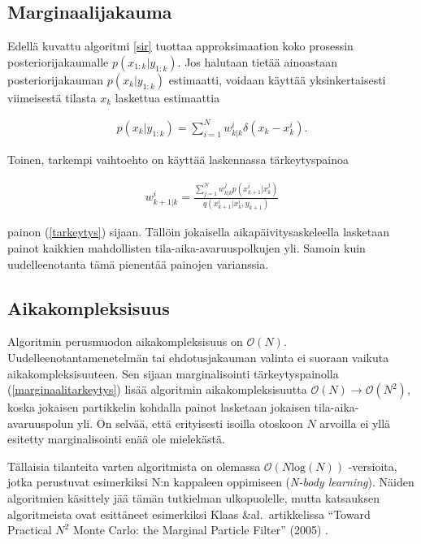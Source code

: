 \documentclass[
  12pt,
  a4paper, twoside]{book}
\begin{document}
\subsection{Marginaalijakauma}

Edellä kuvattu algoritmi \ref{sir} tuottaa approksimaation koko prosessin posteriorijakaumalle \(p(x_{1:k}|y_{1:k})\). Jos halutaan tietää ainoastaan posteriorijakauman \(p(x_k|y_{1:k})\) estimaatti, voidaan käyttää yksinkertaisesti viimeisestä tilasta \(x_k\) laskettua estimaattia

\begin{align}
\hat{p}(x_{k}|y_{1:k})=\sum_{i=1}^{N}w_{k|k}^i \delta(x_{k}-x_{k}^i).
\end{align}

Toinen, tarkempi vaihtoehto on käyttää laskennassa tärkeytyspainoa

\begin{align}\label{marginaalitarkeytys}
w_{k+1|k}^i=\frac{\sum_{j=1}^{N}w_{k|k}^jp(x_{k+1}^i|x_k^j)}{q(x_{k+1}^i|x_k^i,y_{k+1})}
\end{align}

\noindent painon (\ref{tarkeytys}) sijaan. Tällöin jokaisella aikapäivitysaskeleella lasketaan painot kaikkien mahdollisten tila-aika-avaruuspolkujen yli. Samoin kuin uudelleenotanta tämä pienentää painojen varianssia.

\subsection{Aikakompleksisuus}

Algoritmin perusmuodon aikakompleksisuus on \(\mathcal{O}(N)\). Uudelleenotantamenetelmän tai ehdotusjakauman valinta ei suoraan vaikuta aikakompleksisuuteen. Sen sijaan marginalisointi tärkeytyspainolla (\ref{marginaalitarkeytys}) lisää algoritmin aikakompleksisuutta \(\mathcal{O}(N)\rightarrow\mathcal{O}(N^2)\), koska jokaisen partikkelin kohdalla painot lasketaan jokaisen tila-aika-avaruuspolun yli. On selvää, että erityisesti isoilla otoskoon \(N\) arvoilla ei yllä esitetty marginalisointi enää ole mielekästä.

Tällaisia tilanteita varten algoritmista on olemassa \(\mathcal{O}(N\text{log}(N))\) -versioita, jotka perustuvat esimerkiksi N:n kappaleen oppimiseen (\emph{N-body learning}). Näiden algoritmien käsittely jää tämän tutkielman ulkopuolelle, mutta katsauksen algoritmeista ovat esittäneet esimerkiksi Klaas \&al.~artikkelissa ``Toward Practical \(N^2\) Monte Carlo: the Marginal Particle Filter'' (2005) \citep{klaas-2005}.
\end{document}
